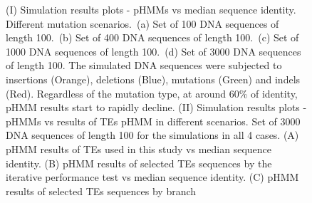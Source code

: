 \documentclass[unnumsec,webpdf,contemporary,large]{oup-authoring-template}%
\theoremstyle{thmstyleone}%
\theoremstyle{thmstyletwo}%
\theoremstyle{thmstylethree}%
\begin{document}
\begin{figure}[hbt!] 
\centering
{}
\caption{(I) Simulation results plots {-} pHMMs vs median sequence identity. Different
mutation scenarios.\ (a) Set of 100 DNA sequences of length 100.\ (b) Set of 400
DNA sequences of length 100.\ (c) Set of 1000 DNA sequences of length 100.\ (d) Set
of 3000 DNA sequences of length 100. The simulated DNA sequences were subjected
to insertions (Orange), deletions (Blue), mutations (Green) and indels (Red). Regardless of the mutation type, at
around 60\% of identity, pHMM results start to rapidly decline.
(II) Simulation results plots {-} pHMMs vs results of TEs pHMM in different
scenarios. Set of 3000 DNA sequences of length 100 for the simulations in all 4
cases. (A) pHMM results of TEs used in this study vs median sequence identity. (B)
pHMM results of selected TEs sequences by the iterative performance test vs
median sequence identity. (C) pHMM results of selected TEs sequences by branch
}
\end{figure}
\end{document}
